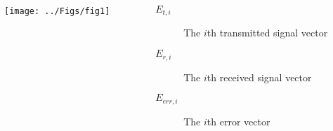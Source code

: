 \documentclass{beamer}
\begin{document}
\begin{frame}
    \begin{columns}
        \begin{column}{.4\textwidth}
            \begin{center}
                \texttt{[image: ../Figs/fig1]}
            \end{center}
        \end{column}
        \hspace*{-2cm}
        \begin{column}{.6\textwidth}
            \begin{description}
                \item[$E_{t,i}$] The $i$th transmitted signal vector
                \item[$E_{r,i}$] The $i$th received signal vector
                \item[$E_{err,i}$] The $i$th error vector
            \end{description}
        \end{column}
    \end{columns}
\end{frame}
\end{document}
